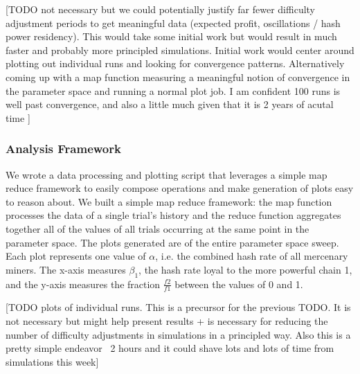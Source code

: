 \documentclass[10pt, preprint]{aastex}
\begin{document}
[TODO not necessary but we could potentially justify far fewer difficulty adjustment periods to get meaningful data (expected profit, oscillations / hash power residency).  This would take some initial work but would result in much faster and probably more principled simulations.  Initial work would center around plotting out individual runs and looking for convergence patterns.  Alternatively coming up with a map function measuring a meaningful notion of convergence in the parameter space and running a normal plot job.  I am confident 100 runs is well past convergence, and also a little much given that it is 2 years of acutal time ]

\subsubsection{Analysis Framework}
We wrote a data processing and plotting script that leverages a simple map reduce framework to easily compose operations and make generation of plots easy to reason about.  We built a simple map reduce framework: the map function processes the data of a single trial's history and the reduce function aggregates together all of the values of all trials occurring at the same point in the parameter space.  The plots generated are of the entire parameter space sweep.  Each plot represents one value of $\alpha$, i.e. the combined hash rate of all mercenary miners.  The x-axis measures $\beta_1$, the hash rate loyal to the more powerful chain 1, and the y-axis measures the fraction $\frac{f2}{f1}$ between the values of 0 and 1.

[TODO plots of individual runs.  This is a precursor for the previous TODO.  It is not necessary but might help present results + is necessary for reducing the number of difficulty adjustments in simulations in a principled way.  Also this is a pretty simple endeavor ~2 hours and it could shave lots and lots of time from simulations this week]
\end{document}
